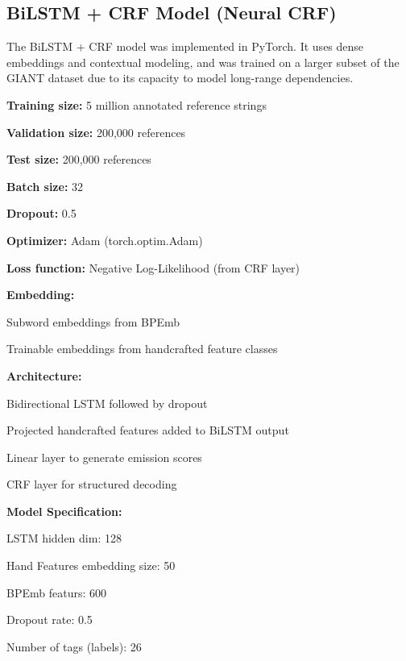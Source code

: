 \subsection{BiLSTM + CRF Model (Neural CRF)}
The BiLSTM + CRF model was implemented in PyTorch. It uses dense embeddings and contextual modeling, and was trained on a larger subset of the GIANT dataset due to its capacity to model long-range dependencies.
\begin{compactitem}
\item \textbf{Training size:} 5 million annotated reference strings
\item \textbf{Validation size:} 200,000 references
\item \textbf{Test size:} 200,000 references
\item \textbf{Batch size:} 32
\item \textbf{Dropout:} 0.5
\item \textbf{Optimizer:} Adam (torch.optim.Adam)
\item \textbf{Loss function:} Negative Log-Likelihood (from CRF layer)
\item \textbf{Embedding:}
\begin{compactitem}
\item Subword embeddings from BPEmb
\item Trainable embeddings from handcrafted feature classes
\end{compactitem}
\item \textbf{Architecture:}
\begin{compactitem}
\item Bidirectional LSTM  followed by dropout
\item Projected handcrafted features added to BiLSTM output
\item Linear layer to generate emission scores
\item CRF layer for structured decoding
\item \textbf{Model Specification:}
\begin{compactitem}
\item LSTM hidden dim: 128
\item Hand Features embedding size: 50
\item BPEmb featurs: 600
\item Dropout rate: 0.5
\item Number of tags (labels): 26
\end{compactitem}
\end{compactitem}
\end{compactitem}

